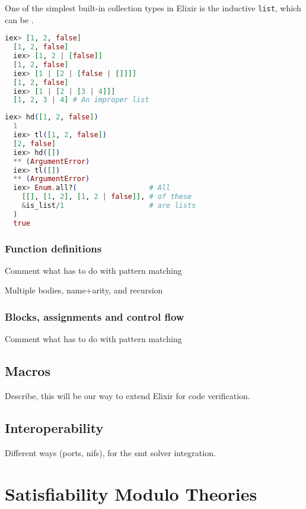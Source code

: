 One of the simplest built-in collection types in Elixir is the inductive 
\verb|list|, which can be .

\begin{lstlisting}[language=elixir,numbers=none,frame=none]
  iex> [1, 2, false]
  [1, 2, false]
  iex> [1, 2 | [false]]
  [1, 2, false]
  iex> [1 | [2 | [false | []]]]
  [1, 2, false]
  iex> [1 | [2 | [3 | 4]]]
  [1, 2, 3 | 4] # An improper list
\end{lstlisting}

\begin{lstlisting}[language=elixir,numbers=none,frame=none]
  iex> hd([1, 2, false])
  1
  iex> tl([1, 2, false])
  [2, false]
  iex> hd([])
  ** (ArgumentError)
  iex> tl([])
  ** (ArgumentError)
  iex> Enum.all?(                 # All
    [[], [1, 2], [1, 2 | false]], # of these
    &is_list/1                    # are lists
  )
  true
\end{lstlisting}

\subsubsection{Function definitions}

Comment what has to do with pattern matching

Multiple bodies, name+arity, and recursion

\subsubsection{Blocks, assignments and control flow}

Comment what has to do with pattern matching

\subsection{Macros}

Describe, this will be our way to extend Elixir for code verification.

\subsection{Interoperability}

Different ways (ports, \gls{nif}s), for the \acrshort{smt} solver integration.

\section{Satisfiability Modulo Theories}

